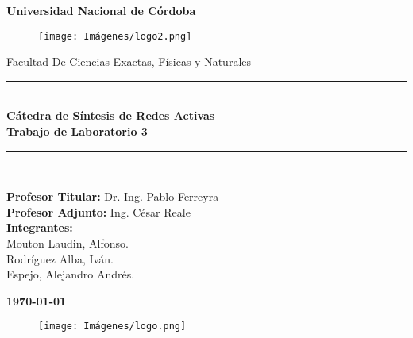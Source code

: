 \begin{titlepage}
	
	\begin{center}
		{\LARGE \textbf{Universidad Nacional de Córdoba}}\\
		\begin{figure}[h]
			\centering
			\texttt{[image: Imágenes/logo2.png]}
		\end{figure}
		
		{\large Facultad De Ciencias Exactas, Físicas y Naturales}
		
		\rule{\linewidth}{0.3mm}\\
		\vspace{5mm}
		{{\large \textbf{Cátedra de Síntesis de Redes Activas}}}\\
		\vspace{5mm}
		{{\Large \textbf{Trabajo de Laboratorio 3}}}
		\rule{\linewidth}{0.3mm}\\
		
		\vspace{10mm}
		
		{\large {\textbf{Profesor Titular:} Dr. Ing. Pablo Ferreyra}\\
        {\textbf{Profesor Adjunto:} Ing. César Reale}\\
        \bigskip
		{\textbf{Integrantes:\\} Mouton Laudin, Alfonso.\\Rodríguez Alba, Iván.\\
Espejo, Alejandro Andrés.}\\}
		
		\vspace{10mm}
		
		\textbf{\monthyeardate\today}

        \vspace{10mm}

        \begin{figure}[h]
			\centering
			\texttt{[image: Imágenes/logo.png]}
		\end{figure}
		
	\end{center}
	

\end{titlepage}
